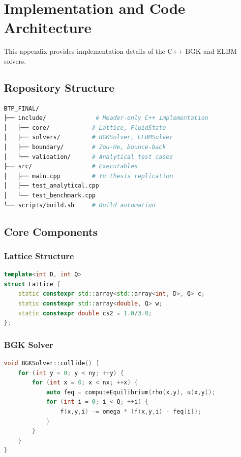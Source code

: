 \chapter{Implementation and Code Architecture}
\label{appendix:code}

This appendix provides implementation details of the C++ BGK and ELBM solvers.

\section{Repository Structure}

\begin{lstlisting}[language=bash, numbers=none]
BTP_FINAL/
├── include/              # Header-only C++ implementation
│   ├── core/            # Lattice, FluidState
│   ├── solvers/         # BGKSolver, ELBMSolver
│   ├── boundary/        # Zou-He, bounce-back
│   └── validation/      # Analytical test cases
├── src/                 # Executables
│   ├── main.cpp         # Yu thesis replication
│   ├── test_analytical.cpp
│   └── test_benchmark.cpp
└── scripts/build.sh     # Build automation
\end{lstlisting}

\section{Core Components}

\subsection{Lattice Structure}

\begin{lstlisting}[language=C++]
template<int D, int Q>
struct Lattice {
    static constexpr std::array<std::array<int, D>, Q> c;
    static constexpr std::array<double, Q> w;
    static constexpr double cs2 = 1.0/3.0;
};
\end{lstlisting}

\subsection{BGK Solver}

\begin{lstlisting}[language=C++]
void BGKSolver::collide() {
    for (int y = 0; y < ny; ++y) {
        for (int x = 0; x < nx; ++x) {
            auto feq = computeEquilibrium(rho(x,y), u(x,y));
            for (int i = 0; i < Q; ++i) {
                f(x,y,i) -= omega * (f(x,y,i) - feq[i]);
            }
        }
    }
}
\end{lstlisting}

